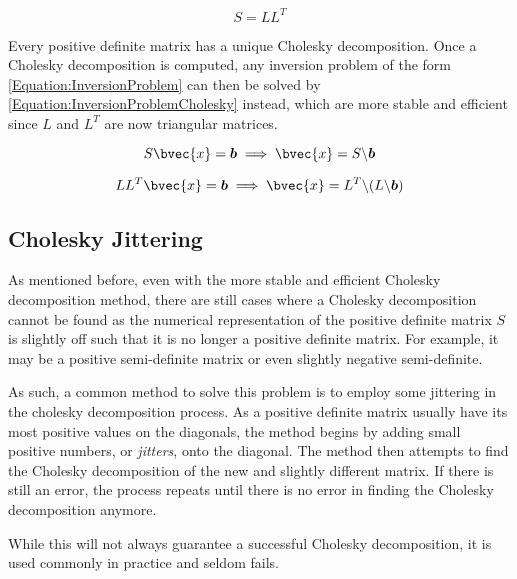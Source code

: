 			\begin{equation}
				S = L L^{T}
			\label{Equation:CholeskyDecomposition}
			\end{equation}
			
			Every positive definite matrix has a unique Cholesky decomposition. Once a Cholesky decomposition is computed, any inversion problem of the form \eqref{Equation:InversionProblem} can then be solved by \eqref{Equation:InversionProblemCholesky} instead, which are more stable and efficient since $L$ and $L^{T}$ are now triangular matrices.
			
			\begin{equation}
				S \bvec{x} = \vec{b} \implies \bvec{x} = S \backslash \vec{b}
			\label{Equation:InversionProblem}
			\end{equation}
			
			\begin{equation}
				L L^{T} \bvec{x} = \vec{b} \implies \bvec{x} = L^{T} \backslash (L \backslash \vec{b})
			\label{Equation:InversionProblemCholesky}
			\end{equation}
			
		\subsection{Cholesky Jittering}
		\label{Appendix:ComputationalAspects:NumericalStability:CholeskyJittering}

			As mentioned before, even with the more stable and efficient Cholesky decomposition method, there are still cases where a Cholesky decomposition cannot be found as the numerical representation of the positive definite matrix $S$ is slightly off such that it is no longer a positive definite matrix. For example, it may be a positive semi-definite matrix or even slightly negative semi-definite.
			
			As such, a common method to solve this problem is to employ some jittering in the cholesky decomposition process. As a positive definite matrix usually have its most positive values on the diagonals, the method begins by adding small positive numbers, or \textit{jitters}, onto the diagonal. The method then attempts to find the Cholesky decomposition of the new and slightly different matrix. If there is still an error, the process repeats until there is no error in finding the Cholesky decomposition anymore.
			
			While this will not always guarantee a successful Cholesky decomposition, it is used commonly in practice and seldom fails.
			
